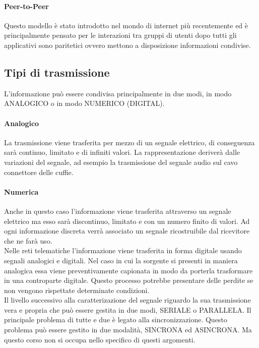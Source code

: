 \documentclass[12pt]{article}
\begin{document}
\paragraph{Peer-to-Peer}
Questo modello è stato introdotto nel mondo di internet più recentemente ed è principalmente pensato per le interazioni tra gruppi di utenti dopo tutti gli applicativi sono paritetici ovvero mettono a disposizione informazioni condivise.

\subsection{Tipi di trasmissione}
L'informazione può essere condivisa principalmente in due modi, in modo ANALOGICO o in modo NUMERICO (DIGITAL).

\paragraph{Analogico}
La trasmissione viene trasferita per mezzo di un segnale elettrico, di conseguenza sarà continuo, limitato e di infiniti valori. La rappresentazione deriverà dalle variazioni del segnale, ad esempio la trasmissione del segnale audio sul cavo connettore delle cuffie.

\paragraph{Numerica}
Anche in questo caso l'informazione viene trasferita attraverso un segnale elettrico ma esso sarà discontinuo, limitato e con un numero finito di valori. Ad ogni informazione discreta verrà associato un segnale ricostruibile dal ricevitore che ne farà uso.\\
Nelle reti telematiche l'informazione viene trasferita in forma digitale usando segnali analogici e digitali. Nel caso in cui la sorgente si presenti in maniera analogica essa viene preventivamente capionata in modo da porterla trasformare in una controparte digitale. Questo processo potrebbe presentare delle perdite se non vengono rispettate determinate condizioni.\\
Il livello successivo alla caratterizazione del segnale riguardo la sua trasmissione vera e propria che può essere gestita in due modi, SERIALE o PARALLELA. Il principale problema di tutte e due è legato alla sincronizzazione. Questo problema può essere gestito in due modalità, SINCRONA ed ASINCRONA. Ma questo corso non si occupa nello specifico di questi argomenti.
\end{document}
